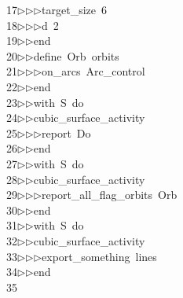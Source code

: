\begin{tabbing}
17\>$\triangleright$\>$\triangleright$\>$\triangleright$\>target\_size\ 6\ \\[0pt]
18\>$\triangleright$\>$\triangleright$\>$\triangleright$\>d\ 2\ \\[0pt]
19\>$\triangleright$\>$\triangleright$\>end\ \\[0pt]
20\>$\triangleright$\>$\triangleright$\>define\ Orb\ orbits\ \\[0pt]
21\>$\triangleright$\>$\triangleright$\>$\triangleright$\>on\_arcs\ Arc\_control\ \\[0pt]
22\>$\triangleright$\>$\triangleright$\>end\ \\[0pt]
23\>$\triangleright$\>$\triangleright$\>with\ S\ do\ \\[0pt]
24\>$\triangleright$\>$\triangleright$\>cubic\_surface\_activity\ \\[0pt]
25\>$\triangleright$\>$\triangleright$\>$\triangleright$\>report\ Do\ \\[0pt]
26\>$\triangleright$\>$\triangleright$\>end\ \\[0pt]
27\>$\triangleright$\>$\triangleright$\>with\ S\ do\ \\[0pt]
28\>$\triangleright$\>$\triangleright$\>cubic\_surface\_activity\ \\[0pt]
29\>$\triangleright$\>$\triangleright$\>$\triangleright$\>report\_all\_flag\_orbits\ Orb\ \\[0pt]
30\>$\triangleright$\>$\triangleright$\>end\ \\[0pt]
31\>$\triangleright$\>$\triangleright$\>with\ S\ do\ \\[0pt]
32\>$\triangleright$\>$\triangleright$\>cubic\_surface\_activity\ \\[0pt]
33\>$\triangleright$\>$\triangleright$\>$\triangleright$\>export\_something\ lines\ \\[0pt]
34\>$\triangleright$\>$\triangleright$\>end\\[0pt]
35\>\end{tabbing}
